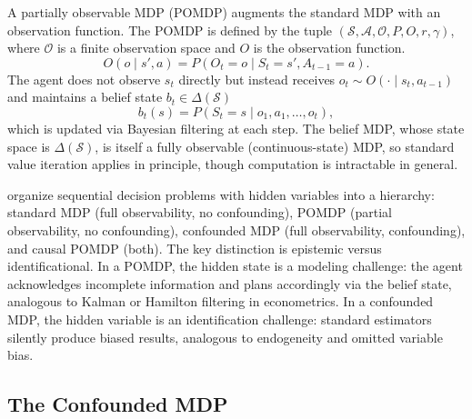 A partially observable MDP (POMDP) augments the standard MDP with an observation function. The POMDP is defined by the tuple $(\mathcal{S}, \mathcal{A}, \mathcal{O}, P, O, r, \gamma)$, where $\mathcal{O}$ is a finite observation space and $O$ is the observation function.
\begin{equation}
O(o \mid s', a) = P(O_t = o \mid S_t = s', A_{t-1} = a).
\label{eq:pomdp_obs}
\end{equation}
The agent does not observe $s_t$ directly but instead receives $o_t \sim O(\cdot \mid s_t, a_{t-1})$ and maintains a belief state $b_t \in \Delta(\mathcal{S})$
\begin{equation}
b_t(s) = P(S_t = s \mid o_1, a_1, \ldots, o_t),
\label{eq:belief_state}
\end{equation}
which is updated via Bayesian filtering at each step. The belief MDP, whose state space is $\Delta(\mathcal{S})$, is itself a fully observable (continuous-state) MDP, so standard value iteration applies in principle, though computation is intractable in general.

\citet{dacostacunha2025unifying} organize sequential decision problems with hidden variables into a hierarchy: standard MDP (full observability, no confounding), POMDP (partial observability, no confounding), confounded MDP (full observability, confounding), and causal POMDP (both). The key distinction is epistemic versus identificational. In a POMDP, the hidden state is a modeling challenge: the agent acknowledges incomplete information and plans accordingly via the belief state, analogous to Kalman or Hamilton filtering in econometrics. In a confounded MDP, the hidden variable is an identification challenge: standard estimators silently produce biased results, analogous to endogeneity and omitted variable bias.

\subsection{The Confounded MDP}
\label{subsec:confounded_mdp}

